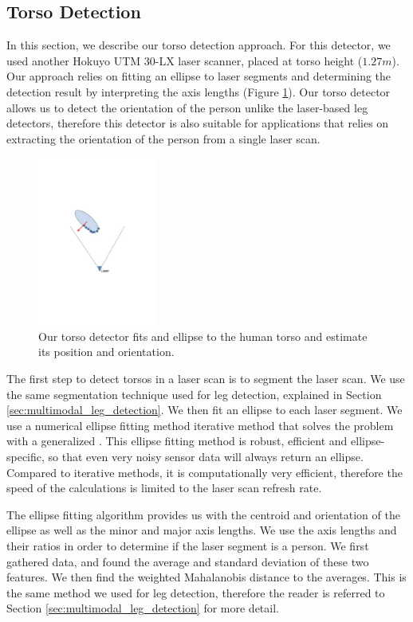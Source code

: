 \documentclass[12pt]{gatech-thesis}
\begin{document}
\subsection{Torso Detection}
\label{sec:multimodal_torso_detection}

In this section, we describe our torso detection approach. For this detector, we used another Hokuyo UTM 30-LX laser scanner, placed at torso height ($1.27m$). Our approach relies on fitting an ellipse to laser segments and determining the detection result by interpreting the axis lengths (Figure \ref{fig:ellipse}). Our torso detector allows us to detect the orientation of the person unlike the laser-based leg detectors, therefore this detector is also suitable for applications that relies on extracting the orientation of the person from a single laser scan. 

\begin{figure}[ht!]
\centering
\includegraphics[width=0.35\textwidth]{pics/ellipse}
\caption{Our torso detector fits and ellipse to the human torso and estimate its position and orientation.}
\label{fig:ellipse}
\end{figure}

The first step to detect torsos in a laser scan is to segment the laser scan. We use the same segmentation technique used for leg detection, explained in Section \ref{sec:multimodal_leg_detection}. We then fit an ellipse to each laser segment. We use a numerical ellipse fitting method iterative method that solves the problem with a generalized \cite{fitzgibbon1999direct}. This ellipse fitting method is robust, efficient and ellipse-specific, so that even very noisy sensor data will always return an ellipse. Compared to iterative methods, it is computationally very efficient, therefore the speed of the calculations is limited to the laser scan refresh rate.

The ellipse fitting algorithm provides us with the centroid and orientation of the ellipse as well as the minor and major axis lengths. We use the axis lengths and their ratios in order to determine if the laser segment is a person. We first gathered data, and found the average and standard deviation of these two features. We then find the weighted Mahalanobis distance to the averages. This is the same method we used for leg detection, therefore the reader is referred to Section \ref{sec:multimodal_leg_detection} for more detail.
\end{document}
